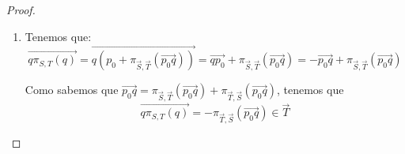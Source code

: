 \begin{proof}
\begin{enumerate}
    \item Tenemos que:
    \begin{equation*}
        \vec{q\pi_{S,T}(q)} = \vec{q(p_0+\pi_{\vec{S}, \vec{T}}(\vec{p_0q}))}
        =  \vec{qp_0} + \pi_{\vec{S}, \vec{T}}(\vec{p_0q})
        =  -\vec{p_0q} + \pi_{\vec{S}, \vec{T}}(\vec{p_0q})
    \end{equation*}

    Como sabemos que $\vec{p_0q} = \pi_{\vec{S}, \vec{T}}(\vec{p_0q}) + \pi_{\vec{T}, \vec{S}}(\vec{p_0q})$, tenemos que
    \begin{equation*}
        \vec{q\pi_{S,T}(q)} = -\pi_{\vec{T}, \vec{S}}(\vec{p_0q}) \in \vec{T}
    \end{equation*}
\end{enumerate}
\end{proof}

